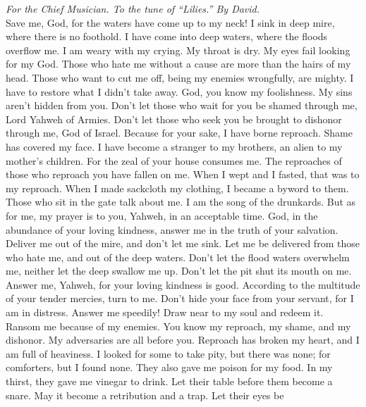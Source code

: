 \emph{For the Chief Musician. To the tune of ``Lilies.'' By David.}\\
 Save me, God, for the waters have come up to my neck!
 I sink in deep mire, where there is no foothold. I have
come into deep waters, where the floods overflow me.  I am
weary with my crying. My throat is dry. My eyes fail looking for my God.
 Those who hate me without a cause are more than the hairs
of my head. Those who want to cut me off, being my enemies wrongfully,
are mighty. I have to restore what I didn't take away. 
God, you know my foolishness. My sins aren't hidden from you.
 Don't let those who wait for you be shamed through me,
Lord Yahweh of Armies. Don't let those who seek you be brought to
dishonor through me, God of Israel.  Because for your
sake, I have borne reproach. Shame has covered my face.  I
have become a stranger to my brothers, an alien to my mother's children.
 For the zeal of your house consumes me. The reproaches of
those who reproach you have fallen on me.  When I wept
and I fasted, that was to my reproach.  When I made
sackcloth my clothing, I became a byword to them.  Those
who sit in the gate talk about me. I am the song of the drunkards.
 But as for me, my prayer is to you, Yahweh, in an
acceptable time. God, in the abundance of your loving kindness, answer
me in the truth of your salvation.  Deliver me out of the
mire, and don't let me sink. Let me be delivered from those who hate me,
and out of the deep waters.  Don't let the flood waters
overwhelm me, neither let the deep swallow me up. Don't let the pit shut
its mouth on me.  Answer me, Yahweh, for your loving
kindness is good. According to the multitude of your tender mercies,
turn to me.  Don't hide your face from your servant, for
I am in distress. Answer me speedily!  Draw near to my
soul and redeem it. Ransom me because of my enemies.  You
know my reproach, my shame, and my dishonor. My adversaries are all
before you.  Reproach has broken my heart, and I am full
of heaviness. I looked for some to take pity, but there was none; for
comforters, but I found none.  They also gave me poison
for my food. In my thirst, they gave me vinegar to drink.
 Let their table before them become a snare. May it
become a retribution and a trap.  Let their eyes be
